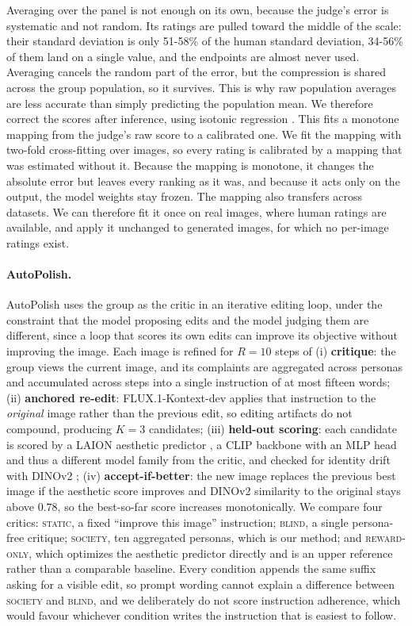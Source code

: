 \documentclass{article}
\begin{document}
Averaging over the panel is not enough on its own, because the judge's error is systematic and not random. Its ratings are pulled toward the middle of the scale: their standard deviation is only 51-58\% of the human standard deviation, 34-56\% of them land on a single value, and the endpoints are almost never used. Averaging cancels the random part of the error, but the compression is shared across the group population, so it survives. This is why raw population averages are less accurate than simply predicting the population mean. We therefore correct the scores after inference, using isotonic regression \citep{niculescu2005}. This fits a monotone mapping from the judge's raw score to a calibrated one. We fit the mapping with two-fold cross-fitting over images, so every rating is calibrated by a mapping that was estimated without it. Because the mapping is monotone, it changes the absolute error but leaves every ranking as it was, and because it acts only on the output, the model weights stay frozen. The mapping also transfers across datasets. We can therefore fit it once on real images, where human ratings are available, and apply it unchanged to generated images, for which no per-image ratings exist.

\paragraph{AutoPolish.} AutoPolish uses the group as the critic in an iterative editing loop, under the constraint that the model proposing edits and the model judging them are different, since a loop that scores its own edits can improve its objective without improving the image. Each image is refined for $R=10$ steps of (i) \textbf{critique}: the group views the current image, and its complaints are aggregated across personas and accumulated across steps into a single instruction of at most fifteen words; (ii) \textbf{anchored re-edit}: FLUX.1-Kontext-dev \citep{flux2024} applies that instruction to the \emph{original} image rather than the previous edit, so editing artifacts do not compound, producing $K=3$ candidates; (iii) \textbf{held-out scoring}: each candidate is scored by a LAION aesthetic predictor \citep{schuhmann2022}, a CLIP \citep{radford2021} backbone with an MLP head and thus a different model family from the critic, and checked for identity drift with DINOv2 \citep{oquab2023}; (iv) \textbf{accept-if-better}: the new image replaces the previous best image if the aesthetic score improves and DINOv2 similarity to the original stays above $0.78$, so the best-so-far score increases monotonically. We compare four critics: \textsc{static}, a fixed ``improve this image'' instruction; \textsc{blind}, a single persona-free critique; \textsc{society}, ten aggregated personas, which is our method; and \textsc{reward-only}, which optimizes the aesthetic predictor directly and is an upper reference rather than a comparable baseline. Every condition appends the same suffix asking for a visible edit, so prompt wording cannot explain a difference between \textsc{society} and \textsc{blind}, and we deliberately do not score instruction adherence, which would favour whichever condition writes the instruction that is easiest to follow.
\end{document}

